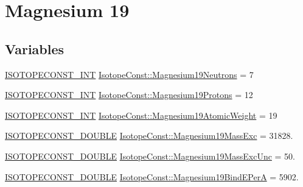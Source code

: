 \hypertarget{group___isotope_const-_magnesium-_mg19}{}\section{Magnesium 19}
\label{group___isotope_const-_magnesium-_mg19}
\subsection*{Variables}
\begin{DoxyCompactItemize}
\item 
\mbox{\hyperlink{group___isotope_const-_macros_ga5f18360b3e99483a35c32d789e62621c}{I\+S\+O\+T\+O\+P\+E\+C\+O\+N\+S\+T\+\_\+\+I\+NT}} \mbox{\hyperlink{group___isotope_const-_magnesium-_mg19_ga1106b3cf5aa0cb0bdffdd55232d357ae}{Isotope\+Const\+::\+Magnesium19\+Neutrons}} = 7
\item 
\mbox{\hyperlink{group___isotope_const-_macros_ga5f18360b3e99483a35c32d789e62621c}{I\+S\+O\+T\+O\+P\+E\+C\+O\+N\+S\+T\+\_\+\+I\+NT}} \mbox{\hyperlink{group___isotope_const-_magnesium-_mg19_ga991ce87c75080131588372f4f632ae1e}{Isotope\+Const\+::\+Magnesium19\+Protons}} = 12
\item 
\mbox{\hyperlink{group___isotope_const-_macros_ga5f18360b3e99483a35c32d789e62621c}{I\+S\+O\+T\+O\+P\+E\+C\+O\+N\+S\+T\+\_\+\+I\+NT}} \mbox{\hyperlink{group___isotope_const-_magnesium-_mg19_gaec25f071e62dcce420ed7f7690a7ff18}{Isotope\+Const\+::\+Magnesium19\+Atomic\+Weight}} = 19
\item 
\mbox{\hyperlink{group___isotope_const-_macros_ga8f45a7272ce02c0b4c65c44636ed719a}{I\+S\+O\+T\+O\+P\+E\+C\+O\+N\+S\+T\+\_\+\+D\+O\+U\+B\+LE}} \mbox{\hyperlink{group___isotope_const-_magnesium-_mg19_ga7346863b9513fda514ed6c1911b5ac62}{Isotope\+Const\+::\+Magnesium19\+Mass\+Exc}} = 31828.
\item 
\mbox{\hyperlink{group___isotope_const-_macros_ga8f45a7272ce02c0b4c65c44636ed719a}{I\+S\+O\+T\+O\+P\+E\+C\+O\+N\+S\+T\+\_\+\+D\+O\+U\+B\+LE}} \mbox{\hyperlink{group___isotope_const-_magnesium-_mg19_gad79113e71ebc91260a7a4d16d29379fe}{Isotope\+Const\+::\+Magnesium19\+Mass\+Exc\+Unc}} = 50.
\item 
\mbox{\hyperlink{group___isotope_const-_macros_ga8f45a7272ce02c0b4c65c44636ed719a}{I\+S\+O\+T\+O\+P\+E\+C\+O\+N\+S\+T\+\_\+\+D\+O\+U\+B\+LE}} \mbox{\hyperlink{group___isotope_const-_magnesium-_mg19_ga77b06227962bb4e22b844874379843e7}{Isotope\+Const\+::\+Magnesium19\+Bind\+E\+PerA}} = 5902.
\item 

\end{DoxyCompactItemize}

